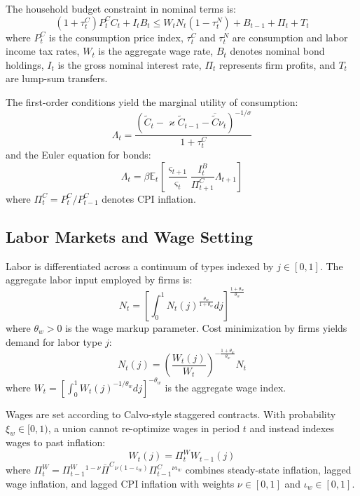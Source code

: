 \documentclass[12pt]{article}
\begin{document}
The household budget constraint in nominal terms is:
\begin{equation}
(1 + \tau_t^C) P_t^C C_t + I_t B_t \leq W_t N_t (1 - \tau_t^N) + B_{t-1} + \Pi_t + T_t
\end{equation}
where $P_t^C$ is the consumption price index, $\tau_t^C$ and $\tau_t^N$ are consumption and labor income tax rates, $W_t$ is the aggregate wage rate, $B_t$ denotes nominal bond holdings, $I_t$ is the gross nominal interest rate, $\Pi_t$ represents firm profits, and $T_t$ are lump-sum transfers.

The first-order conditions yield the marginal utility of consumption:
\begin{equation}\label{eq:lambda}
\Lambda_t = \frac{(\tilde{C}_t - \varkappa \tilde{C}_{t-1} - \overline{\tilde{C}} \nu_t)^{-1/\sigma}}{1 + \tau_t^C}
\end{equation}
and the Euler equation for bonds:
\begin{equation}\label{eq:euler}
\Lambda_t = \beta \mathbb{E}_t \left[ \frac{\varsigma_{t+1}}{\varsigma_t} \frac{I_t^B}{\Pi_{t+1}^C} \Lambda_{t+1} \right]
\end{equation}
where $\Pi_t^C = P_t^C / P_{t-1}^C$ denotes CPI inflation.

\subsection{Labor Markets and Wage Setting}

Labor is differentiated across a continuum of types indexed by $j \in [0,1]$. The aggregate labor input employed by firms is:
\begin{equation}
N_t = \left[ \int_0^1 N_t(j)^{\frac{\theta_w}{1+\theta_w}} dj \right]^{\frac{1+\theta_w}{\theta_w}}
\end{equation}
where $\theta_w > 0$ is the wage markup parameter. Cost minimization by firms yields demand for labor type $j$:
\begin{equation}
N_t(j) = \left( \frac{W_t(j)}{W_t} \right)^{-\frac{1+\theta_w}{\theta_w}} N_t
\end{equation}
where $W_t = \left[ \int_0^1 W_t(j)^{-1/\theta_w} dj \right]^{-\theta_w}$ is the aggregate wage index.

Wages are set according to Calvo-style staggered contracts. With probability $\xi_w \in [0,1)$, a union cannot re-optimize wages in period $t$ and instead indexes wages to past inflation:
\begin{equation}
W_t(j) = \Pi_t^W W_{t-1}(j)
\end{equation}
where $\Pi_t^W = \Pi_{t-1}^W {}^{1-\nu} \overline{\Pi}^C {}^{\nu(1-\iota_w)} \Pi_{t-1}^C {}^{\nu \iota_w}$ combines steady-state inflation, lagged wage inflation, and lagged CPI inflation with weights $\nu \in [0,1]$ and $\iota_w \in [0,1]$.
\end{document}
